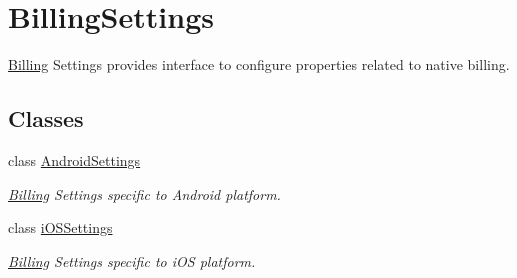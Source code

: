 \hypertarget{class_voxel_busters_1_1_native_plugins_1_1_billing_settings}{}\section{Billing\+Settings}
\label{class_voxel_busters_1_1_native_plugins_1_1_billing_settings}


\hyperlink{class_voxel_busters_1_1_native_plugins_1_1_billing}{Billing} Settings provides interface to configure properties related to native billing.  


\subsection*{Classes}
\begin{DoxyCompactItemize}
\item 
class \hyperlink{class_voxel_busters_1_1_native_plugins_1_1_billing_settings_1_1_android_settings}{Android\+Settings}
\begin{DoxyCompactList}\small\item\em \hyperlink{class_voxel_busters_1_1_native_plugins_1_1_billing}{Billing} Settings specific to Android platform. \end{DoxyCompactList}\item 
class \hyperlink{class_voxel_busters_1_1_native_plugins_1_1_billing_settings_1_1i_o_s_settings}{i\+O\+S\+Settings}
\begin{DoxyCompactList}\small\item\em \hyperlink{class_voxel_busters_1_1_native_plugins_1_1_billing}{Billing} Settings specific to i\+O\+S platform. \end{DoxyCompactList}\end{DoxyCompactItemize}

